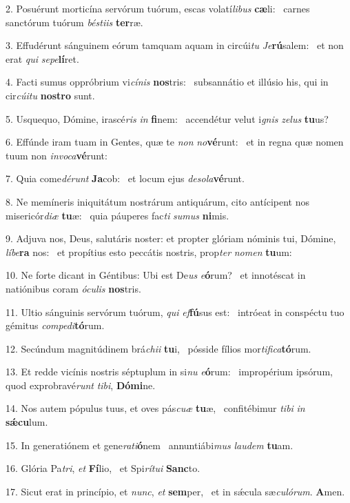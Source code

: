 2. Posuérunt morticína servórum tuórum, escas volatí\textit{li}\textit{bus} \textbf{cæ}li: \ast\  carnes sanctórum tuórum \textit{bés}\textit{ti}\textit{is} \textbf{ter}ræ.\

3. Effudérunt sánguinem eórum tamquam aquam in circúi\textit{tu} \textit{Je}\textbf{rú}salem: \ast\  et non erat \textit{qui} \textit{se}\textit{pe}\textbf{lí}ret.\

4. Facti sumus oppróbrium vi\textit{cí}\textit{nis} \textbf{nos}tris: \ast\  subsannátio et illúsio his, qui in cir\textit{cú}\textit{i}\textit{tu} \textbf{nos}\textbf{tro} sunt.\

5. Usquequo, Dómine, irascé\textit{ris} \textit{in} \textbf{fi}nem: \ast\  accendétur velut i\textit{gnis} \textit{ze}\textit{lus} \textbf{tu}us?\

6. Effúnde iram tuam in Gentes, quæ te \textit{non} \textit{no}\textbf{vé}runt: \ast\  et in regna quæ nomen tuum non \textit{in}\textit{vo}\textit{ca}\textbf{vé}runt:\

7. Quia come\textit{dé}\textit{runt} \textbf{Ja}cob: \ast\  et locum ejus \textit{de}\textit{so}\textit{la}\textbf{vé}runt.\

8. Ne memíneris iniquitátum nostrárum antiquárum, cito antícipent nos misericór\textit{di}\textit{æ} \textbf{tu}æ: \ast\  quia páuperes fac\textit{ti} \textit{su}\textit{mus} \textbf{ni}mis.\

9. Adjuva nos, Deus, salutáris noster: et propter glóriam nóminis tui, Dómine, \textit{lí}\textit{be}\textbf{ra} nos: \ast\  et propítius esto peccátis nostris, prop\textit{ter} \textit{no}\textit{men} \textbf{tu}um:\

10. Ne forte dicant in Géntibus: Ubi est De\textit{us} \textit{e}\textbf{ó}rum? \ast\  et innotéscat in natiónibus coram \textit{ó}\textit{cu}\textit{lis} \textbf{nos}tris.\

11. Ultio sánguinis servórum tuórum, \textit{qui} \textit{ef}\textbf{fú}sus est: \ast\  intróeat in conspéctu tuo gémitus \textit{com}\textit{pe}\textit{di}\textbf{tó}rum.\

12. Secúndum magnitúdinem brá\textit{chi}\textit{i} \textbf{tu}i, \ast\  pósside fílios mor\textit{ti}\textit{fi}\textit{ca}\textbf{tó}rum.\

13. Et redde vicínis nostris séptuplum in si\textit{nu} \textit{e}\textbf{ó}rum: \ast\  impropérium ipsórum, quod exprobravé\textit{runt} \textit{ti}\textit{bi}, \textbf{Dó}\textbf{mi}ne.\

14. Nos autem pópulus tuus, et oves pás\textit{cu}\textit{æ} \textbf{tu}æ, \ast\  confitébimur \textit{ti}\textit{bi} \textit{in} \textbf{sǽ}\textbf{cu}lum.\

15. In generatiónem et gene\textit{ra}\textit{ti}\textbf{ó}nem \ast\  annuntiábi\textit{mus} \textit{lau}\textit{dem} \textbf{tu}am.\

16. Glória Pa\textit{tri}, \textit{et} \textbf{Fí}lio, \ast\  et Spi\textit{rí}\textit{tu}\textit{i} \textbf{Sanc}to.\

17. Sicut erat in princípio, et \textit{nunc}, \textit{et} \textbf{sem}per, \ast\  et in sǽcula sæ\textit{cu}\textit{ló}\textit{rum}. \textbf{A}men.\

